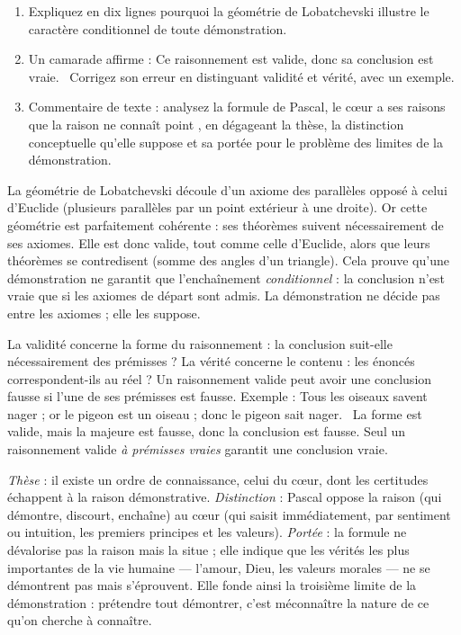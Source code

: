 \documentclass[11pt]{article}
\begin{document}
\begin{exercice}
\begin{enumerate}
\item Expliquez en dix lignes pourquoi la géométrie de Lobatchevski illustre le caractère conditionnel de toute démonstration.
\item Un camarade affirme : \guillemotleft Ce raisonnement est valide, donc sa conclusion est vraie. \guillemotright\ Corrigez son erreur en distinguant validité et vérité, avec un exemple.
\item Commentaire de texte : analysez la formule de Pascal, \guillemotleft le cœur a ses raisons que la raison ne connaît point \guillemotright, en dégageant la thèse, la distinction conceptuelle qu'elle suppose et sa portée pour le problème des limites de la démonstration.
\end{enumerate}
\end{exercice}

\begin{corrige}[Exercice 1]
La géométrie de Lobatchevski découle d'un axiome des parallèles opposé à celui d'Euclide (plusieurs parallèles par un point extérieur à une droite). Or cette géométrie est parfaitement cohérente : ses théorèmes suivent nécessairement de ses axiomes. Elle est donc valide, tout comme celle d'Euclide, alors que leurs théorèmes se contredisent (somme des angles d'un triangle). Cela prouve qu'une démonstration ne garantit que l'enchaînement \emph{conditionnel} : la conclusion n'est vraie que si les axiomes de départ sont admis. La démonstration ne décide pas entre les axiomes ; elle les suppose.
\end{corrige}

\begin{corrige}[Exercice 2]
La validité concerne la forme du raisonnement : la conclusion suit-elle nécessairement des prémisses ? La vérité concerne le contenu : les énoncés correspondent-ils au réel ? Un raisonnement valide peut avoir une conclusion fausse si l'une de ses prémisses est fausse. Exemple : \guillemotleft Tous les oiseaux savent nager ; or le pigeon est un oiseau ; donc le pigeon sait nager. \guillemotright\ La forme est valide, mais la majeure est fausse, donc la conclusion est fausse. Seul un raisonnement valide \emph{à prémisses vraies} garantit une conclusion vraie.
\end{corrige}

\begin{corrige}[Exercice 3]
\emph{Thèse} : il existe un ordre de connaissance, celui du cœur, dont les certitudes échappent à la raison démonstrative. \emph{Distinction} : Pascal oppose la raison (qui démontre, discourt, enchaîne) au cœur (qui saisit immédiatement, par sentiment ou intuition, les premiers principes et les valeurs). \emph{Portée} : la formule ne dévalorise pas la raison mais la situe ; elle indique que les vérités les plus importantes de la vie humaine — l'amour, Dieu, les valeurs morales — ne se démontrent pas mais s'éprouvent. Elle fonde ainsi la troisième limite de la démonstration : prétendre tout démontrer, c'est méconnaître la nature de ce qu'on cherche à connaître.
\end{corrige}
\end{document}
